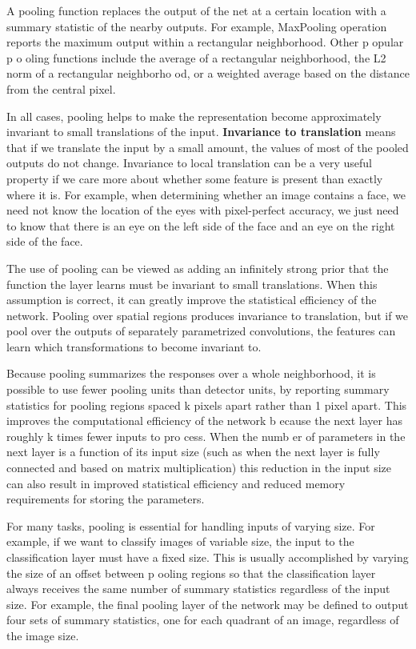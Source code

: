 \documentclass{report}
\begin{document}
A pooling function replaces the output of the net at a certain location with a summary statistic of the nearby outputs. For example, MaxPooling operation reports the maximum output within a rectangular neighborhood. Other p opular p o oling functions include the average of a rectangular neighborhood, the L2 norm of a rectangular neighborho od, or a weighted average based on the distance from the central pixel.

In all cases, pooling helps to make the representation become approximately invariant to small translations of the input. \textbf{Invariance to translation} means that if we translate the input by a small amount, the values of most of the pooled outputs do not change. Invariance to local translation can be a very useful property if we care more about whether some feature is present than exactly where it is. For example, when determining whether an image contains a face, we need not know the location of the eyes with pixel-perfect accuracy, we just need to know that there is an eye on the left side of the face and an eye on the right side of the face.

The use of pooling can be viewed as adding an infinitely strong prior that the function the layer learns must be invariant to small translations. When this assumption is correct, it can greatly improve the statistical efficiency of the network. Pooling over spatial regions produces invariance to translation, but if we pool over the outputs of separately parametrized convolutions, the features can learn which transformations to become invariant to.

Because pooling summarizes the responses over a whole neighborhood, it is possible to use fewer pooling units than detector units, by reporting summary statistics for pooling regions spaced k pixels apart rather than 1 pixel apart. This improves the computational efficiency of the network b ecause the next layer has roughly k times fewer inputs to pro cess. When the numb er of parameters in the next layer is a function of its input size (such as when the next layer is fully connected and based on matrix multiplication) this reduction in the input size can also result in improved statistical efficiency and reduced memory requirements for storing the parameters.

For many tasks, pooling is essential for handling inputs of varying size. For example, if we want to classify images of variable size, the input to the classification layer must have a fixed size. This is usually accomplished by varying the size of an offset between p ooling regions so that the classification layer always receives the same number of summary statistics regardless of the input size. For example, the final pooling layer of the network may be defined to output four sets of summary statistics, one for each quadrant of an image, regardless of the image size.
\end{document}
